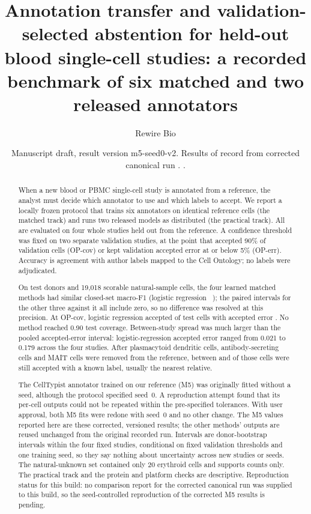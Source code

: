 \documentclass[11pt]{article}
\title{Annotation transfer and validation-selected abstention for held-out blood single-cell studies: a recorded benchmark of six matched and two released annotators}
\author{Rewire Bio}
\date{Manuscript draft, result version m5-seed0-v2. Results of record from corrected canonical run \runid. \Reprostatus.}
\newif\ifctreport
\newcommand{\reprostatus}{\ifctreport a seed-controlled reproduction of the corrected M5 results was run and compared with the corrected canonical run by the repository's tiered comparison; that internal comparison reports overall status ``\ctres{comparison}{report}{overall}''. This is an internal tolerance comparison by the same pipeline, not independent verification\else no comparison report for the corrected canonical run was supplied to this build, so the seed-controlled reproduction of the corrected M5 results is pending\fi}
\begin{document}
\maketitle

\begin{abstract}
\noindent When a new blood or PBMC single-cell study is annotated from a reference, the analyst must decide which annotator to use and which labels to accept. We report a locally frozen protocol that trains six annotators on identical reference cells (the matched track) and runs two released models as distributed (the practical track). All are evaluated on four whole studies held out from the reference. A confidence threshold was fixed on two separate validation studies, at the point that accepted 90\% of validation cells (OP-cov) or kept validation accepted error at or below 5\% (OP-err). Accuracy is agreement with author labels mapped to the Cell Ontology; no labels were adjudicated.

On  test donors and 19{,}018 scorable natural-sample cells, the four learned matched methods had similar closed-set macro-F1 (logistic regression ~); the paired intervals for the other three against it all include zero, so no difference was resolved at this precision. At OP-cov, logistic regression accepted  of test cells with accepted error . No method reached 0.90 test coverage. Between-study spread was much larger than the pooled accepted-error interval: logistic-regression accepted error ranged from 0.021 to 0.179 across the four studies. After plasmacytoid dendritic cells, antibody-secreting cells and MAIT cells were removed from the reference, between  and  of those cells were still accepted with a known label, usually the nearest relative.

The CellTypist annotator trained on our reference (M5) was originally fitted without a seed, although the protocol specified seed~0. A reproduction attempt found that its per-cell outputs could not be repeated within the pre-specified tolerances. With user approval, both M5 fits were redone with seed~0 and no other change. The M5 values reported here are these corrected, versioned results; the other methods' outputs are reused unchanged from the original recorded run. Intervals are donor-bootstrap intervals within the four fixed studies, conditional on fixed validation thresholds and one training seed, so they say nothing about uncertainty across new studies or seeds. The natural-unknown set contained only 20 erythroid cells and supports counts only. The practical track and the protein and platform checks are descriptive. Reproduction status for this build: \reprostatus.
\end{abstract}
\end{document}
